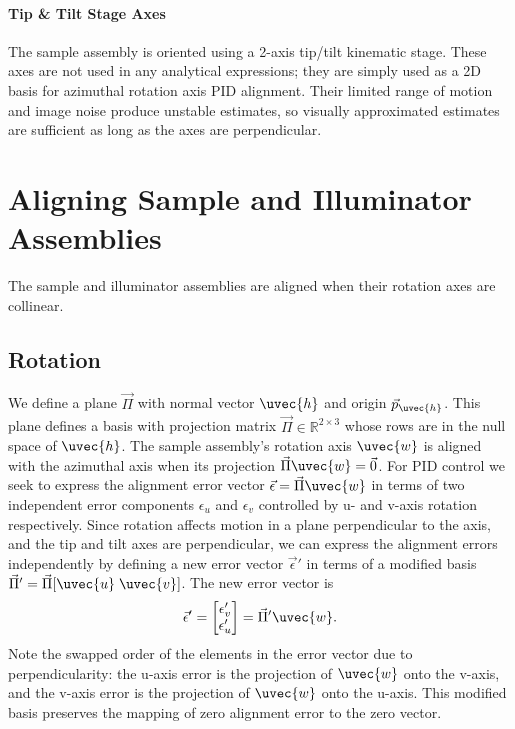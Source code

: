 \paragraph{Tip \& Tilt Stage Axes} The sample assembly is oriented using a 2-axis tip/tilt kinematic stage. These axes are not used in any analytical expressions; they are simply used as a 2D basis for azimuthal rotation axis PID alignment. Their limited range of motion and image noise produce unstable estimates, so visually approximated estimates are sufficient as long as the axes are perpendicular.

\section{Aligning Sample and Illuminator Assemblies}
The sample and illuminator assemblies are aligned when their rotation axes are collinear. 

\subsection{Rotation}
We define a plane $\vec{\Pi}$ with normal vector $\uvec{h}$ and origin $\vec{p}_{\uvec{h}}$. This plane defines a basis with projection matrix $\vec{\Pi} \in \mathbb{R}^{2 \times 3}$ whose rows are in the null space of $\uvec{h}$. The sample assembly's rotation axis $\uvec{w}$ is aligned with the azimuthal axis when its projection $\vec{\Pi} \uvec{w} = \vec{0}$. For PID control we seek to express the alignment error vector $\vec{\epsilon} = \vec{\Pi} \uvec{w}$ in terms of two independent error components $\epsilon_u$ and $\epsilon_v$ controlled by u- and v-axis rotation respectively. Since rotation affects motion in a plane perpendicular to the axis, and the tip and tilt axes are perpendicular, we can express the alignment errors independently by defining a new error vector $\vec{\epsilon}'$ in terms of a modified basis $\vec{\Pi}' = \vec{\Pi} [\uvec{u} \; \uvec{v}]$. The new error vector is
%
\begin{equation}
    \vec{\epsilon}' = 
    \begin{bmatrix}
        \epsilon'_v \\
        \epsilon'_u
    \end{bmatrix} = \vec{\Pi}' \uvec{w}.
\end{equation}
Note the swapped order of the elements in the error vector due to perpendicularity: the u-axis error is the projection of $\uvec{w}$ onto the v-axis, and the v-axis error is the projection of $\uvec{w}$ onto the u-axis. This modified basis preserves the mapping of zero alignment error to the zero vector.

